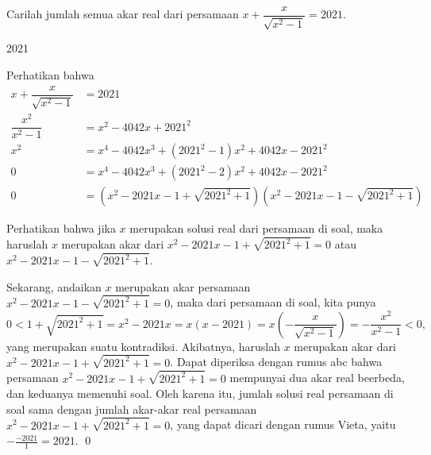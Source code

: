 \documentclass[12pt]{scrartcl}
\begin{document}
	\begin{soaljawab}
		Carilah jumlah semua akar real dari persamaan $x+\dfrac{x}{\sqrt{x^2-1}}=2021.$
		
		\begin{jawaban}
		2021
		\end{jawaban}
		\begin{solusi}
		Perhatikan bahwa
		\begin{align*}
		x+\dfrac{x}{\sqrt{x^2-1}} &= 2021 \\
		\dfrac{x^2}{x^2-1} &= x^2-4042x+2021^2 \\
		x^2 &= x^4-4042x^3+(2021^2-1)x^2+4042x-2021^2 \\
		0 &= x^4-4042x^3+(2021^2-2)x^2+4042x-2021^2 \\
		0 &= (x^2-2021x-1+\sqrt{2021^2+1})(x^2-2021x-1-\sqrt{2021^2+1})
		\end{align*}
		
		Perhatikan bahwa jika $x$ merupakan solusi real dari persamaan di soal, maka haruslah $x$ merupakan akar dari  $x^2-2021x-1+\sqrt{2021^2+1}=0$ atau $x^2-2021x-1-\sqrt{2021^2+1}$. 
		
		Sekarang, andaikan $x$ merupakan akar persamaan $x^2-2021x-1-\sqrt{2021^2+1}=0$, maka dari persamaan di soal, kita punya 
		$$0<1+\sqrt{2021^2+1}=x^2-2021x=x(x-2021)=x\left(-\dfrac{x}{\sqrt{x^2-1}}\right)=-\dfrac{x^2}{x^2-1}<0,$$
		yang merupakan suatu kontradiksi. Akibatnya, haruslah $x$ merupakan akar dari $x^2-2021x-1+\sqrt{2021^2+1}=0$. Dapat diperiksa dengan rumus abc bahwa persamaan  $x^2-2021x-1+\sqrt{2021^2+1}=0$ mempunyai dua akar real beerbeda, dan keduanya memenuhi soal. Oleh karena itu, jumlah solusi real persamaan di soal sama dengan jumlah akar-akar real persamaan  $x^2-2021x-1+\sqrt{2021^2+1}=0$, yang dapat dicari dengan rumus Vieta, yaitu $-\frac{-2021}{1}=2021$. \qed
		\end{solusi}
	\end{soaljawab}
	
\end{document}
